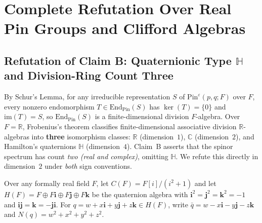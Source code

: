 \documentclass[11pt,a4paper]{article}
\theoremstyle{plain}
\theoremstyle{definition}
\newcommand{\Pin}{\mathrm{Pin}}
\newcommand{\End}{\mathrm{End}}
\newcommand{\R}{\mathbb{R}}
\newcommand{\C}{\mathbb{C}}
\newcommand{\HH}{\mathbb{H}}
\begin{document}
\section{Complete Refutation Over Real Pin Groups and Clifford Algebras}

\subsection{Refutation of Claim B: Quaternionic Type \texorpdfstring{$\HH$}{H} and Division-Ring Count Three}

By Schur's Lemma, for any irreducible representation $S$ of $\Pin^\varepsilon(p,q; F)$ over $F$, every nonzero endomorphism $T \in \End_{\Pin}(S)$ has $\ker(T) = \{0\}$ and $\mathrm{im}(T) = S$, so $\End_{\Pin}(S)$ is a finite-dimensional division $F$-algebra. Over $F = \R$, Frobenius's theorem classifies finite-dimensional associative division $\R$-algebras into \textbf{three} isomorphism classes: $\R$ (dimension~$1$), $\C$ (dimension~$2$), and Hamilton's quaternions $\HH$ (dimension~$4$). Claim~B asserts that the spinor spectrum has count \emph{two (real and complex)}, omitting $\HH$. We refute this directly in dimension~$2$ under \emph{both} sign conventions.

Over any formally real field $F$, let $C(F) = F[i]/(i^2+1)$ and let $H(F) = F \oplus F\mathbf{i} \oplus F\mathbf{j} \oplus F\mathbf{k}$ be the quaternion algebra with $\mathbf{i}^2 = \mathbf{j}^2 = \mathbf{k}^2 = -1$ and $\mathbf{i}\mathbf{j} = \mathbf{k} = -\mathbf{j}\mathbf{i}$. For $q = w + x\mathbf{i} + y\mathbf{j} + z\mathbf{k} \in H(F)$, write $\bar{q} = w - x\mathbf{i} - y\mathbf{j} - z\mathbf{k}$ and $N(q) = w^2 + x^2 + y^2 + z^2$.
\end{document}
